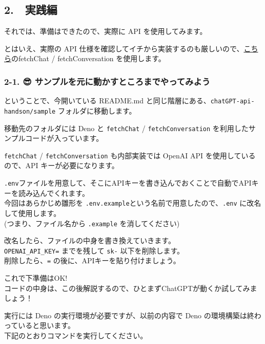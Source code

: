 \subsection{2. 💪 実践編}\label{ux5b9fux8df5ux7de8}

それでは、準備はできたので、実際に API を使用してみます。

とはいえ、実際の API
仕様を確認してイチから実装するのも厳しいので、\href{https://github.com/code4fukui/ai_chat}{こちら}のfetchChat
/ fetchConversation を使用します。

\subsubsection{2-1. 😎
サンプルを元に動かすところまでやってみよう}\label{ux30b5ux30f3ux30d7ux30ebux3092ux5143ux306bux52d5ux304bux3059ux3068ux3053ux308dux307eux3067ux3084ux3063ux3066ux307fux3088ux3046}

ということで、今開いている README.md
と同じ階層にある、\texttt{chatGPT-api-handson/sample}
フォルダに移動します。

移動先のフォルダには Deno と \texttt{fetchChat} /
\texttt{fetchConversation} を利用したサンプルコードが入っています。

\texttt{fetchChat} / \texttt{fetchConversation} も内部実装では OpenAI
API を使用しているので、API キーが必要になります。

\texttt{.env}ファイルを用意して、そこにAPIキーを書き込んでおくことで自動でAPIキーを読み込んでくれます。\\
今回はあらかじめ雛形を
\texttt{.env.example}という名前で用意したので、\texttt{.env}
に改名して使用します。\\
(つまり、ファイル名から \texttt{.example} を消してください)

改名したら、ファイルの中身を書き換えていきます。\\
\texttt{OPENAI\_API\_KEY=} までを残して \texttt{sk-}
以下を削除します。\\
削除したら、\texttt{=} の後に、APIキーを貼り付けましょう。

これで下準備はOK!\\
コードの中身は、この後解説するので、ひとまずChatGPTが動くか試してみましょう！

実行には Deno の実行環境が必要ですが、以前の内容で Deno
の環境構築は終わっていると思います。\\
下記のとおりコマンドを実行してください。

\begin{Shaded}
\begin{Highlighting}[]
\end{Highlighting}
\end{Shaded}

